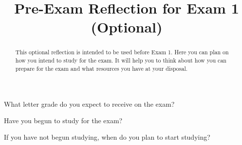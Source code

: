 \documentclass{ximera}
\title{Pre-Exam Reflection for Exam 1 (Optional)}
\begin{document}
\begin{abstract}
This optional reflection is intended to be used before Exam 1. Here you can plan on how you intend to study for the exam. It will help you to think about how you can prepare for the exam and what resources you have at your disposal.
\end{abstract}
\maketitle


\begin{question}
    What letter grade do you expect to receive on the exam?

  \begin{multipleChoice}
  \end{multipleChoice}
\end{question}

\begin{question}
    Have you begun to study for the exam?

  \begin{multipleChoice}
  \end{multipleChoice}
\end{question}

\begin{question}
    If you have not begun studying, when do you plan to start studying?

  \begin{multipleChoice}
  \end{multipleChoice}
\end{question}
\end{document}
